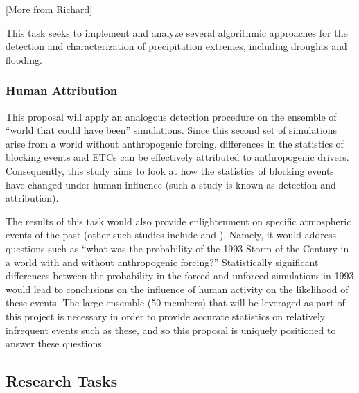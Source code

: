 \documentclass[11pt]{article}
\begin{document}
{\color{red}[More from Richard]}

This task seeks to implement and analyze several algorithmic approaches for the detection and characterization of precipitation extremes, including droughts and flooding.

\subsubsection{Human Attribution}

This proposal will apply an analogous detection procedure on the ensemble of ``world that could have been'' simulations.  Since this second set of simulations arise from a world without anthropogenic forcing, differences in the statistics of blocking events and ETCs can be effectively attributed to anthropogenic drivers.  Consequently, this study aims to look at how the statistics of blocking events have changed under human influence (such a study is known as detection and attribution).

The results of this task would also provide enlightenment on specific atmospheric events of the past (other such studies include \cite{stott2004human} and \cite{pall2011anthropogenic}).  Namely, it would address questions such as ``what was the probability of the 1993 Storm of the Century in a world with and without anthropogenic forcing?''  Statistically significant differences between the probability in the forced and unforced simulations in 1993 would lead to conclusions on the influence of human activity on the likelihood of these events.  The large ensemble (50 members) that will be leveraged as part of this project is necessary in order to provide accurate statistics on relatively infrequent events such as these, and so this proposal is uniquely positioned to answer these questions.

\subsection{Research Tasks}


\end{document}
